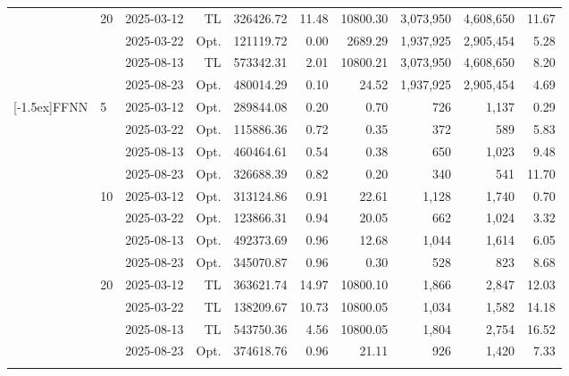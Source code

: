 \begin{table}[!h]
\begin{tabular}{llrrrrrrrr}
            \addlinespace
             & \multirow{4}{*}{20} & 2025-03-12 & TL & 326426.72 & 11.48 & 10800.30 & 3,073,950 & 4,608,650 & 11.67 \\
             &  & 2025-03-22 & Opt. & 121119.72 & 0.00 & 2689.29 & 1,937,925 & 2,905,454 & 5.28 \\
             &  & 2025-08-13 & TL & 573342.31 & 2.01 & 10800.21 & 3,073,950 & 4,608,650 & 8.20 \\
             &  & 2025-08-23 & Opt. & 480014.29 & 0.10 & 24.52 & 1,937,925 & 2,905,454 & 4.69 \\
            \addlinespace
            \midrule
            \multirow{12}{*}[-1.5ex]{FFNN} & \multirow{4}{*}{5} & 2025-03-12 & Opt. & 289844.08 & 0.20 & 0.70 & 726 & 1,137 & 0.29 \\
             &  & 2025-03-22 & Opt. & 115886.36 & 0.72 & 0.35 & 372 & 589 & 5.83 \\
             &  & 2025-08-13 & Opt. & 460464.61 & 0.54 & 0.38 & 650 & 1,023 & 9.48 \\
             &  & 2025-08-23 & Opt. & 326688.39 & 0.82 & 0.20 & 340 & 541 & 11.70 \\
            \addlinespace
             & \multirow{4}{*}{10} & 2025-03-12 & Opt. & 313124.86 & 0.91 & 22.61 & 1,128 & 1,740 & 0.70 \\
             &  & 2025-03-22 & Opt. & 123866.31 & 0.94 & 20.05 & 662 & 1,024 & 3.32 \\
             &  & 2025-08-13 & Opt. & 492373.69 & 0.96 & 12.68 & 1,044 & 1,614 & 6.05 \\
             &  & 2025-08-23 & Opt. & 345070.87 & 0.96 & 0.30 & 528 & 823 & 8.68 \\
            \addlinespace
             & \multirow{4}{*}{20} & 2025-03-12 & TL & 363621.74 & 14.97 & 10800.10 & 1,866 & 2,847 & 12.03 \\
             &  & 2025-03-22 & TL & 138209.67 & 10.73 & 10800.05 & 1,034 & 1,582 & 14.18 \\
             &  & 2025-08-13 & TL & 543750.36 & 4.56 & 10800.05 & 1,804 & 2,754 & 16.52 \\
             &  & 2025-08-23 & Opt. & 374618.76 & 0.96 & 21.11 & 926 & 1,420 & 7.33 \\
            \addlinespace
            \bottomrule
        \end{tabular}
\end{table}